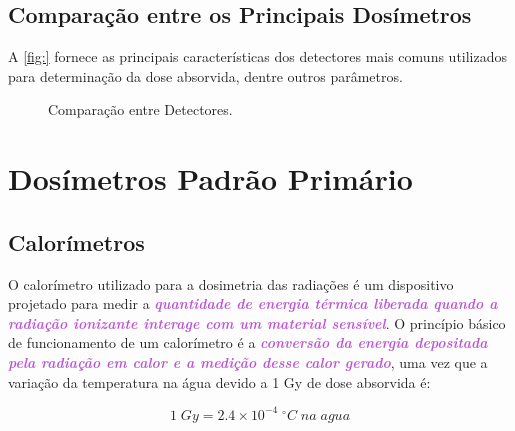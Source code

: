 \documentclass[11pt,a4paper]{article}
\begin{document}
\subsection*{Comparação entre os Principais Dosímetros}

	A \ref{fig:} fornece as principais características dos detectores mais comuns utilizados para determinação da dose absorvida, dentre outros parâmetros.

	\begin{figure}[h]
		\centering
		\caption{Comparação entre Detectores.}
		\label{fig:comparacaoDetectores}
	\end{figure}



\section{Dosímetros Padrão Primário}

\subsection*{Calorímetros}

		O calorímetro utilizado para a dosimetria das radiações é um dispositivo projetado para medir a \textcolor{MediumOrchid}{\textit{\textbf{quantidade de energia térmica liberada quando a radiação ionizante interage com um material sensível}}}. O princípio básico de funcionamento de um calorímetro é a \textcolor{MediumOrchid}{\textit{\textbf{conversão da energia depositada pela radiação em calor e a medição desse calor gerado}}}, uma vez que a variação da temperatura na água devido a 1 Gy de dose absorvida é:
		
			\begin{equation}
				1 \; Gy = 2.4 \times 10^{-4}\;{}^{\circ}C \; na \; agua
			\end{equation}
\end{document}
